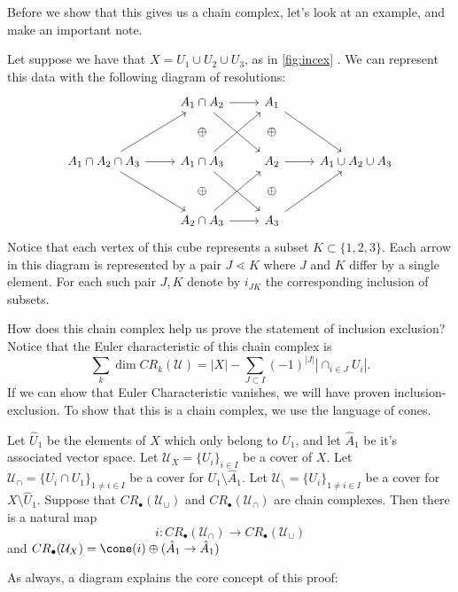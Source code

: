 Before we show that this gives us a chain complex, let's look at an example, and make an important note.

\begin{example}
\label{exam:inclusionexclusioncomplex}
Let suppose we have that  $X=U_1\cup U_2\cup U_3$, as in  \ref{fig:incex} . We can represent this data with the following diagram of resolutions:
\[	\begin{tikzcd}[row sep=small]
			\;&A_1  \cap A_2\arrow{r} \arrow{ddr} & A_1 \arrow{ddr}\\
			&\oplus&\oplus\\
			A_1\arrow{r} \arrow{uur} \arrow{ddr} \cap A_2\cap A_3 & A_1\cap A_3 \arrow{uur} \arrow{ddr}& A_2 \arrow{r} & A_1\cup A_2\cup A_3\\ 
			&\oplus&\oplus\\
			&A_2\cap A_3 \arrow{uur} \arrow{r} & A_3 \arrow{uur}
		\end{tikzcd}\]
Notice that each vertex of this cube represents a subset $K\subset\{1,2,3\}$. Each arrow in this diagram is represented by a pair $J\lessdot K$ where $J$ and $K$ differ by a single element. For each such pair $J,K$ denote by $i_{JK}$ the corresponding inclusion of subsets.\\
\end{example}
How does this chain complex help us prove the statement of inclusion exclusion? Notice that the Euler characteristic of this chain complex is 
\[
\sum_{k} \dim CR_k(\mathcal U)=|X|-\sum_{J\subset I}(-1)^{|J|} \left|\cap_{i\in J} U_i\right|. 
\]
If we can show that Euler Characteristic vanishes, we will have proven inclusion-exclusion.  
To show that this is a chain complex, we use the language of cones. 
\begin{lemma}
Let $\hat U_1$ be the elements of $X$ which only belong to $U_1$, and let $\hat A_1$ be it's associated vector space.  Let $\mathcal U_X=\{U_i\}_{i\in I}$ be a cover of $X$. Let $\mathcal U_{\cap}=\{U_i\cap U_1\}_{1\neq i\in I} $ be a cover for $U_1\setminus \hat A_1$. Let $\mathcal U_{\setminus}=\{U_i\}_{1\neq i\in I}$ be a cover for $X \setminus \hat U_1$. Suppose that $CR_\bullet(\mathcal U_\cup)$ and $CR_\bullet(\mathcal U_\cap)$ are chain complexes. Then there is a natural map 
\[i: CR_\bullet(\mathcal U_\cap)\to CR_\bullet(\mathcal U_\cup)\]
and $CR_\bullet(\mathcal U_X)=\cone(i)\oplus (\hat A_1\to \hat A_1)$
\end{lemma}
As always, a diagram explains the core concept of this proof:
